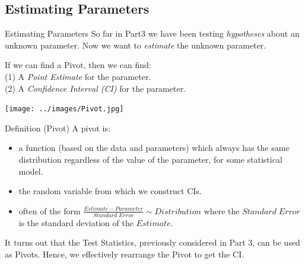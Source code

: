 \documentclass[t,xcolor=pdftex,dvipsnames,table]{beamer}
\begin{document}
\subsection[Estimating]{Estimating Parameters}
\begin{frame}{Estimating Parameters}
So far in Part3 we have been testing {\it hypotheses} about an unknown parameter. 
Now we want to {\it estimate} the unknown parameter.

\vspace{.5cm}
If we can find a Pivot, then we can find:\\
(1) A {\it Point Estimate} for the parameter. \\
(2) A {\it Confidence Interval (CI)} for the parameter. 

\vspace{.5cm}
\texttt{[image: ../images/Pivot.jpg]}
\end{frame} 
 
 
\begin{frame}{}
\begin{block}{Definition (Pivot)}
A pivot is:
\begin{itemize}
\item a function (based on the data and parameters) which always has the same distribution regardless of the value of the parameter, for some statistical model.
\item the random variable from which we construct CIs.
\item often of the form $\frac{Estimate - Parameter}{Standard \; Error} \sim Distribution$
where the $Standard \; Error$ is the standard deviation of the $Estimate$.
\end{itemize}
\end{block}

\vspace{.5cm}
It turns out that the Test Statistics, previously considered in Part 3, can be used as Pivots. Hence, we effectively rearrange the Pivot to get the CI.
\end{frame} 
\end{document}
